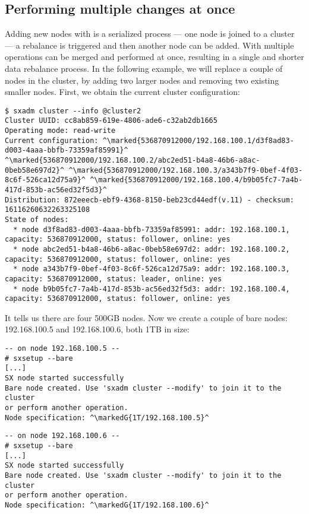\subsection{Performing multiple changes at once}
Adding new nodes with  is a serialized process --- one node is
joined to a cluster --- a rebalance is triggered and then another node can be
added. With  multiple operations can be merged
and performed at once, resulting in a single and shorter data rebalance
process. In the following example, we will replace a couple of nodes in the
cluster, by adding two larger nodes and removing two existing smaller nodes.
First, we obtain the current cluster configuration:
\begin{lstlisting}
$ sxadm cluster --info @cluster2
Cluster UUID: cc8ab859-619e-4806-ade6-c32ab2db1665
Operating mode: read-write
Current configuration: ^\marked{536870912000/192.168.100.1/d3f8ad83-d003-4aaa-bbfb-73359af85991}^ ^\marked{536870912000/192.168.100.2/abc2ed51-b4a8-46b6-a8ac-0beb58e697d2}^ ^\marked{536870912000/192.168.100.3/a343b7f9-0bef-4f03-8c6f-526ca12d75a9}^ ^\marked{536870912000/192.168.100.4/b9b05fc7-7a4b-417d-853b-ac56ed32f5d3}^
Distribution: 872eeecb-ebf9-4368-8150-beb23cd44edf(v.11) - checksum: 16116260632263325108
State of nodes:
  * node d3f8ad83-d003-4aaa-bbfb-73359af85991: addr: 192.168.100.1, capacity: 536870912000, status: follower, online: yes
  * node abc2ed51-b4a8-46b6-a8ac-0beb58e697d2: addr: 192.168.100.2, capacity: 536870912000, status: follower, online: yes
  * node a343b7f9-0bef-4f03-8c6f-526ca12d75a9: addr: 192.168.100.3, capacity: 536870912000, status: leader, online: yes
  * node b9b05fc7-7a4b-417d-853b-ac56ed32f5d3: addr: 192.168.100.4, capacity: 536870912000, status: follower, online: yes
\end{lstlisting}
It tells us there are four 500GB nodes. Now we create a couple of bare nodes: 192.168.100.5
and 192.168.100.6, both 1TB in size:
\begin{lstlisting}
-- on node 192.168.100.5 --
# sxsetup --bare
[...]
SX node started successfully
Bare node created. Use 'sxadm cluster --modify' to join it to the cluster
or perform another operation.
Node specification: ^\markedG{1T/192.168.100.5}^
\end{lstlisting}
\begin{lstlisting}
-- on node 192.168.100.6 --
# sxsetup --bare
[...]
SX node started successfully
Bare node created. Use 'sxadm cluster --modify' to join it to the cluster
or perform another operation.
Node specification: ^\markedG{1T/192.168.100.6}^
\end{lstlisting}
